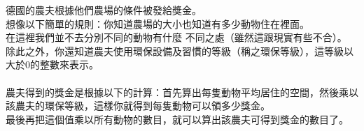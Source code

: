 德國的農夫根據他們農場的條件被發給獎金。\\
想像以下簡單的規則：你知道農場的大小也知道有多少動物住在裡面。\\
在這裡我們並不去分別不同的動物有什麼 不同之處（雖然這跟現實有些不合）。\\
除此之外，你還知道農夫使用環保設備及習慣的等級（稱之環保等級），這等級以大於0的整數來表示。\\
\\
農夫得到的獎金是根據以下的計算：首先算出每隻動物平均居住的空間，然後乘以該農夫的環保等級，這樣你就得到每隻動物可以領多少獎金。\\
最後再把這個值乘以所有動物的數目，就可以算出該農夫可得到獎金的數目了。\\
